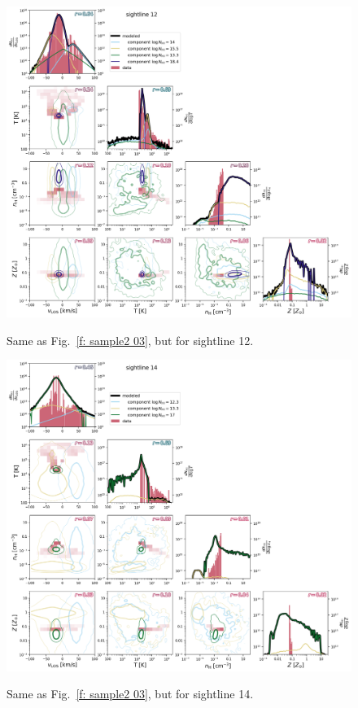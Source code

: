 \documentclass[fleqn,usenatbib]{mnras}
\begin{document}
\begin{figure}
    \centering
    \includegraphics[width=\textwidth]{figures/sample2/sightline_0012.png}
    \label{f: sample2 12}
    \caption{Same as Fig.~\ref{f: sample2 03}, but for sightline 12.}
\end{figure}

\begin{figure}
    \centering
    \includegraphics[width=\textwidth]{figures/sample2/sightline_0014.png}
    \label{f: sample2 14}
    \caption{Same as Fig.~\ref{f: sample2 03}, but for sightline 14.}
\end{figure}
\end{document}
